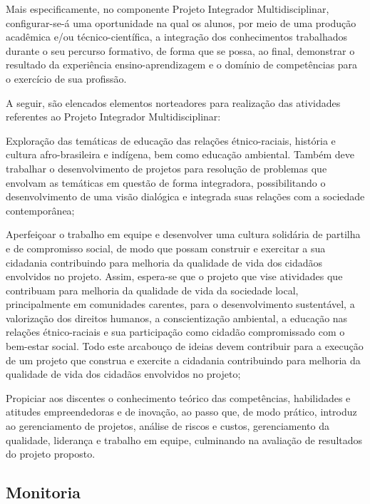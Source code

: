 \documentclass[
	12pt,				%
	openright,			%
	twoside,			%
	a4paper,			%
	chapter=TITLE,		%
	english,			%
	french,				%
	spanish,			%
	brazil,				%
	]{abntex2}
\begin{document}
Mais especificamente, no componente  Projeto Integrador Multidisciplinar, configurar-se-á uma oportunidade na qual os alunos, por meio de uma produção acadêmica e/ou técnico-científica, a integração dos conhecimentos trabalhados durante o seu percurso formativo, de forma que se possa, ao final, demonstrar o resultado da experiência ensino-aprendizagem e o domínio de competências para o exercício de sua profissão.

A seguir, são elencados elementos norteadores para realização das atividades referentes ao Projeto Integrador Multidisciplinar:

\begin{alineas}
	\item Exploração das temáticas de educação das relações étnico-raciais, história e cultura afro-brasileira e indígena, bem como educação ambiental. Também deve trabalhar o desenvolvimento de projetos para resolução de problemas que envolvam as temáticas em questão de forma integradora, possibilitando  o desenvolvimento de uma visão dialógica e integrada  suas relações com a sociedade contemporânea;
	\item Aperfeiçoar o trabalho em equipe e desenvolver uma cultura solidária de partilha e de compromisso social, de modo que possam construir e exercitar a sua cidadania contribuindo para melhoria da qualidade de vida dos cidadãos envolvidos no projeto. Assim, espera-se que o projeto que vise atividades que contribuam para melhoria da qualidade de vida da sociedade local, principalmente em comunidades carentes, para o desenvolvimento sustentável, a valorização dos direitos humanos, a conscientização ambiental, a educação nas relações étnico-raciais e sua participação como cidadão compromissado com o bem-estar social. Todo este arcabouço de ideias devem contribuir para a execução de um projeto que construa e exercite a cidadania contribuindo para melhoria da qualidade de vida dos cidadãos envolvidos no projeto;
	\item Propiciar aos discentes o conhecimento teórico das competências, habilidades e atitudes empreendedoras e de inovação, ao passo que, de modo prático, introduz ao gerenciamento de projetos, análise de riscos e custos, gerenciamento da qualidade, liderança e trabalho em equipe, culminando na avaliação de resultados do projeto proposto.


\end{alineas}


\subsection{Monitoria}
\end{document}
